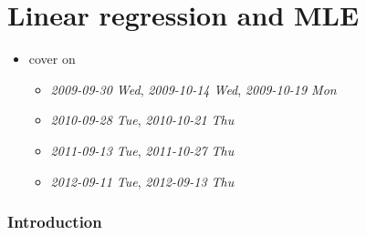 
\part*{Linear regression and MLE}%

\begin{itemize}
\item cover on
\begin{itemize}
\item \textit{2009-09-30 Wed}, \textit{2009-10-14 Wed}, \textit{2009-10-19 Mon}
\item \textit{2010-09-28 Tue}, \textit{2010-10-21 Thu}
\item \textit{2011-09-13 Tue}, \textit{2011-10-27 Thu}
\item \textit{2012-09-11 Tue}, \textit{2012-09-13 Thu}
\end{itemize}
\end{itemize}
\section{Introduction}
\label{sec-1}

